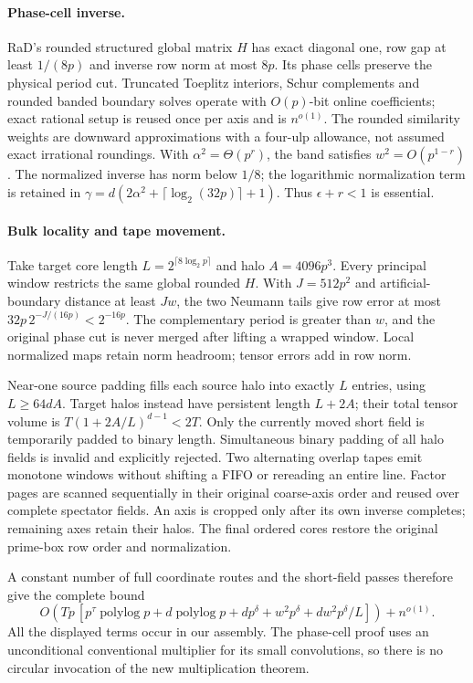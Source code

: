 \documentclass[11pt]{article}
\begin{document}
\paragraph{Phase-cell inverse.}
RaD's rounded structured global matrix $H$ has exact diagonal one,
row gap at least $1/(8p)$ and inverse row norm at most $8p$.
Its phase cells preserve the physical period cut. Truncated Toeplitz
interiors, Schur complements and rounded banded boundary solves operate
with $O(p)$-bit online coefficients; exact rational setup is reused once
per axis and is $n^{o(1)}$. The rounded similarity weights are downward
approximations with a four-ulp allowance, not assumed exact irrational
roundings. With $\alpha^2=\Theta(p^r)$, the band satisfies
$w^2=O(p^{1-r})$. The normalized inverse has norm below $1/8$;
the logarithmic normalization term is retained in
$\gamma=d(2\alpha^2+\lceil\log_2(32p)\rceil+1)$.
Thus $\epsilon+r<1$ is essential.

\paragraph{Bulk locality and tape movement.}
Take target core length $L=2^{\lceil8\log_2p\rceil}$ and halo
$A=4096p^3$. Every principal window restricts the same global rounded $H$.
With $J=512p^2$ and artificial-boundary distance at least $Jw$, the two
Neumann tails give row error at most $32p\,2^{-J/(16p)}<2^{-16p}$.
The complementary period is greater than $w$, and the original phase cut
is never merged after lifting a wrapped window. Local normalized maps
retain norm headroom; tensor errors add in row norm.

Near-one source padding fills each source halo into exactly $L$ entries,
using $L\ge64dA$. Target halos instead have persistent length $L+2A$;
their total tensor volume is $T(1+2A/L)^{d-1}<2T$. Only the currently
moved short field is temporarily padded to binary length. Simultaneous
binary padding of all halo fields is invalid and explicitly rejected.
Two alternating overlap tapes emit monotone windows without shifting a
FIFO or rereading an entire line. Factor pages are scanned sequentially
in their original coarse-axis order and reused over complete spectator
fields. An axis is cropped only after its own inverse completes; remaining
axes retain their halos. The final ordered cores restore the original
prime-box row order and normalization.

A constant number of full coordinate routes and the short-field passes
therefore give the complete bound
\[
 O\!\left(Tp\,[p^\tau\operatorname{polylog}p+
 d\operatorname{polylog}p+d p^\delta+w^2p^\delta+
 d w^2p^\delta/L]\right)+n^{o(1)}.
\]
All the displayed terms occur in our assembly. The phase-cell proof uses
an unconditional conventional multiplier for its small convolutions, so
there is no circular invocation of the new multiplication theorem.
\end{document}
